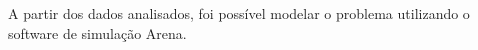 A partir dos dados analisados, foi possível modelar o problema utilizando o software de simulação Arena. 